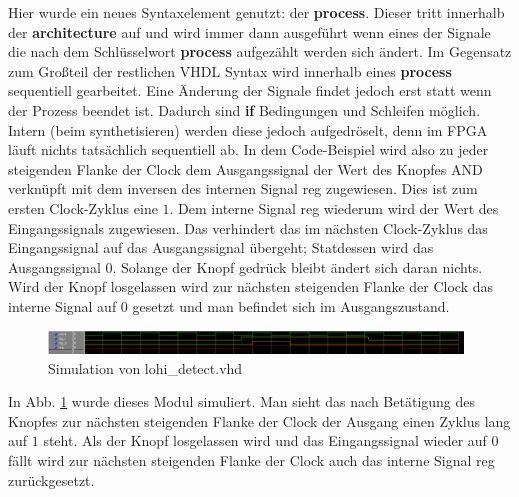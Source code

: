 Hier wurde ein neues Syntaxelement genutzt: der \textbf{process}.
Dieser tritt innerhalb der \textbf{architecture} auf und wird immer dann ausgeführt wenn eines der Signale die nach dem Schlüsselwort \textbf{process} aufgezählt werden sich ändert.
Im Gegensatz zum Großteil der restlichen VHDL Syntax wird innerhalb eines \textbf{process} sequentiell gearbeitet.
Eine Änderung der Signale findet jedoch erst statt wenn der Prozess beendet ist.
Dadurch sind \textbf{if} Bedingungen und Schleifen möglich.
Intern (beim synthetisieren) werden diese jedoch aufgedröselt, denn im FPGA läuft nichts tatsächlich sequentiell ab.
In dem Code-Beispiel wird also zu jeder steigenden Flanke der Clock dem Ausgangssignal der Wert des Knopfes AND verknüpft mit dem inversen des internen Signal reg zugewiesen.
Dies ist zum ersten Clock-Zyklus eine $1$.
Dem interne Signal reg wiederum wird der Wert des Eingangssignals zugewiesen.
Das verhindert das im nächsten Clock-Zyklus das Eingangssignal auf das Ausgangssignal übergeht; Statdessen wird das Ausgangssignal $0$.
Solange der Knopf gedrück bleibt ändert sich daran nichts.
Wird der Knopf losgelassen wird zur nächsten steigenden Flanke der Clock das interne Signal auf $0$ gesetzt und man befindet sich im Ausgangszustand.

\begin{figure}[ht]
	\centering
    \includegraphics[width=0.98\textwidth]{../Daten/lohi_detect.png}
	\caption{Simulation von lohi\_detect.vhd}
	\label{img_lohi_detect}
\end{figure}

In Abb. \ref{img_lohi_detect} wurde dieses Modul simuliert.
Man sieht das nach Betätigung des Knopfes zur nächsten steigenden Flanke der Clock der Ausgang einen Zyklus lang auf $1$ steht.
Als der Knopf losgelassen wird und das Eingangssignal wieder auf $0$ fällt wird zur nächsten steigenden Flanke der Clock auch das interne Signal reg zurückgesetzt.
